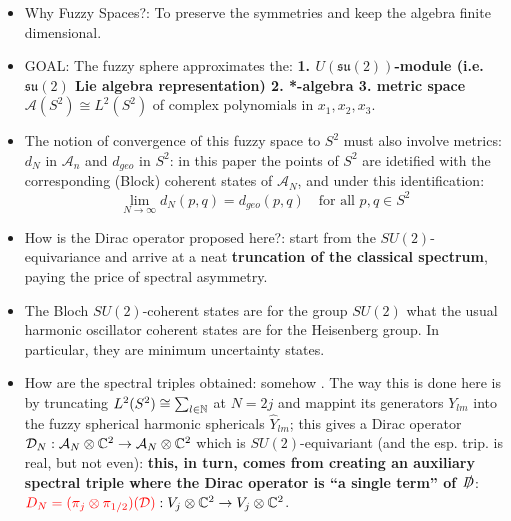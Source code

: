 \documentclass{article}
\newcommand{\alg}[1]{\ensuremath{\mathfrak{#1}}}
\begin{document}
    \begin{itemize}

    \item Why Fuzzy Spaces?: To preserve the symmetries and keep the algebra finite dimensional.
    
    \item GOAL: The fuzzy sphere approximates the: \textbf{1. $U(\alg{su}(2))$-module (i.e. $\alg{su}(2)$ Lie algebra representation) 2. *-algebra 3. metric space} $\mathcal A(S^2) \cong L^2(S^2)$ of complex polynomials in $x_1, x_2, x_3$.
    
    \item The notion of convergence of this fuzzy space to $S^2$ must also involve metrics: $d_N$ in $\mathcal A_n$ and $d_{geo}$ in $S^2$: in this paper the points of $S^2$ are idetified with the corresponding (Block) coherent states of $\mathcal A_N$, and under this identification:
    \begin{equation}
        \lim_{N \to \infty} d_N(p, q) = d_{geo}(p, q)\quad \text{for all }p, q \in S^2
    \end{equation}
    
    \item How is the Dirac operator proposed here?: start from the $SU(2)$-equivariance and arrive at a neat \textbf{truncation of the classical spectrum}, paying the price of spectral asymmetry.
    
    \item The Bloch $SU(2)$-coherent states are for the group $SU(2)$ what the usual harmonic oscillator coherent states are for the Heisenberg group. In particular, they are minimum uncertainty states.
    
    \item How are the spectral triples obtained: somehow . The way this is done here is by truncating $L^2(S^2) \cong \sum_{l \in \mathbb{N}}$ at $N = 2j$ and mappint its generators $Y_{lm}$ into the fuzzy spherical harmonic sphericals $\hat Y_{lm}$; this gives a Dirac operator $\mathcal D_N: \mathcal A_N \otimes \mathbb{C}^2 \to \mathcal A_N \otimes \mathbb{C}^2$ which is $SU(2)$-equivariant (and the esp. trip. is real, but not even): \textbf{this, in turn, comes from creating an auxiliary spectral triple where the Dirac operator is ``a single term'' of $\slashed D$}: $\textcolor{red}{D_N = (\pi_j \otimes \pi_{1/2})(\mathcal D)}: V_j \otimes \mathbb{C}^2 \to V_j \otimes \mathbb{C}^2$.
    

\end{itemize}
\end{document}
